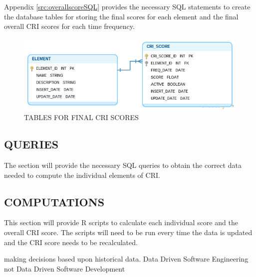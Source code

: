 \documentclass[SDSUThesis.tex]{subfiles}
\begin{document}
        Appendix \ref{src:overallscoreSQL} provides the necessary SQL statements to create the 
        database tables for storing the final scores for each element and the final 
        overall CRI scores for each time frequency.
        
       \begin{figure}[ht]
            \centering
            \includegraphics[scale=.55]{images/final_score_tables.png}
            \caption{TABLES FOR FINAL CRI SCORES}
            \label{fig:final_score_tables}
        \end{figure}

\subsection{QUERIES}
    The section will provide the necessary SQL queries to obtain the correct data
    needed to compute the individual elements of CRI.
    
\subsection{COMPUTATIONS}
    This section will provide R scripts to calculate each individual score and the overall 
    CRI score. The scripts will need to be run every time the data is updated and the CRI
    score needs to be recalculated.
    
    

making decisions based upon historical data. 
Data Driven Software Engineering not Data Driven Software Development
\end{document}
